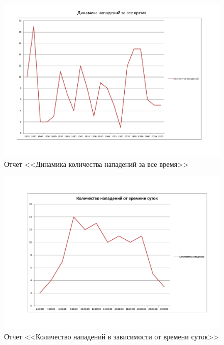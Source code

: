 \documentclass[russian,utf8,simple,emptystyle]{eskdtext}
\begin{document}
\begin{figure}[ht]
\centering
\includegraphics[width=\textwidth, angle=90]{report4}
\caption{Отчет <<Динамика количества нападений за все время>>}
\end{figure}

\begin{figure}[ht]
\centering
\includegraphics[width=\textwidth, angle=90]{report5}
\caption{Отчет <<Количество нападений в зависимости от времени суток>>}
\end{figure}
\end{document}
